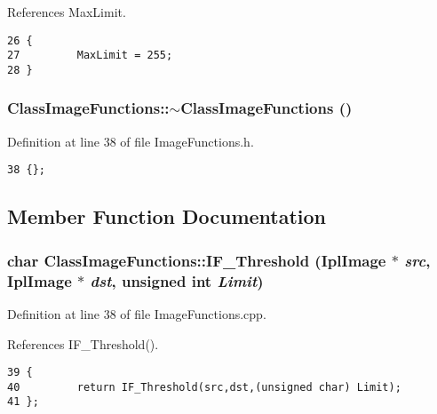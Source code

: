 References Max\-Limit.

\footnotesize\begin{verbatim}26 {
27         MaxLimit = 255;
28 }
\end{verbatim}\normalsize 


\subsubsection{\setlength{\rightskip}{0pt plus 5cm}Class\-Image\-Functions::$\sim${\bf Class\-Image\-Functions} ()\hspace{0.3cm}{\tt  [inline]}}\label{classClassImageFunctions_ClassImageFunctionsa1}


Definition at line 38 of file Image\-Functions.h.

\footnotesize\begin{verbatim}38 {}; 
\end{verbatim}\normalsize 




\subsection{Member Function Documentation}
\subsubsection{\setlength{\rightskip}{0pt plus 5cm}char Class\-Image\-Functions::IF\_\-Threshold (Ipl\-Image $\ast$ {\em src}, Ipl\-Image $\ast$ {\em dst}, unsigned int {\em Limit})}\label{classClassImageFunctions_ClassImageFunctionsa3}


Definition at line 38 of file Image\-Functions.cpp.

References IF\_\-Threshold().

\footnotesize\begin{verbatim}39 {
40         return IF_Threshold(src,dst,(unsigned char) Limit);
41 };
\end{verbatim}\normalsize 


